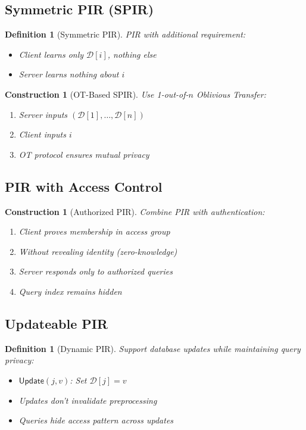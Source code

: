 \documentclass[11pt,final,hidelinks]{article}
\newcommand{\DB}{\mathcal{D}}
\newtheorem{definition}[theorem]{Definition}
\newtheorem{construction}[theorem]{Construction}
\begin{document}
\subsection{Symmetric PIR (SPIR)}

\begin{definition}[Symmetric PIR]
PIR with additional requirement:
\begin{itemize}
    \item Client learns only $\DB[i]$, nothing else
    \item Server learns nothing about $i$
\end{itemize}
\end{definition}

\begin{construction}[OT-Based SPIR]
Use 1-out-of-$n$ Oblivious Transfer:
\begin{enumerate}
    \item Server inputs $(\DB[1], \ldots, \DB[n])$
    \item Client inputs $i$
    \item OT protocol ensures mutual privacy
\end{enumerate}
\end{construction}

\subsection{PIR with Access Control}

\begin{construction}[Authorized PIR]
Combine PIR with authentication:
\begin{enumerate}
    \item Client proves membership in access group
    \item Without revealing identity (zero-knowledge)
    \item Server responds only to authorized queries
    \item Query index remains hidden
\end{enumerate}
\end{construction}

\subsection{Updateable PIR}

\begin{definition}[Dynamic PIR]
Support database updates while maintaining query privacy:
\begin{itemize}
    \item $\mathsf{Update}(j, v)$: Set $\DB[j] = v$
    \item Updates don't invalidate preprocessing
    \item Queries hide access pattern across updates
\end{itemize}
\end{definition}
\end{document}

